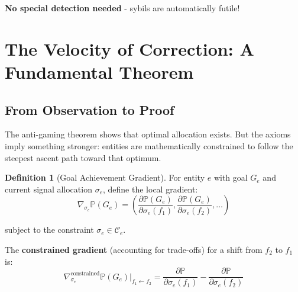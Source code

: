 \documentclass[11pt,a4paper]{article}
\theoremstyle{definition}
\newtheorem{definition}[theorem]{Definition}
\theoremstyle{remark}
\newcommand{\C}{\mathcal{C}}
\begin{document}
\textbf{No special detection needed} - sybils are automatically futile!

\section{The Velocity of Correction: A Fundamental Theorem}

\subsection{From Observation to Proof}

The anti-gaming theorem shows that optimal allocation exists. But the axioms imply something stronger: entities are mathematically constrained to follow the steepest ascent path toward that optimum.

\begin{definition}[Goal Achievement Gradient]
For entity $e$ with goal $G_e$ and current signal allocation $\sigma_e$, define the local gradient:
\[ \nabla_{\sigma_e} \mathbb{P}(G_e) = \left( \frac{\partial \mathbb{P}(G_e)}{\partial \sigma_e(f_1)}, \frac{\partial \mathbb{P}(G_e)}{\partial \sigma_e(f_2)}, \ldots \right) \]

subject to the constraint $\sigma_e \in \C_e$.

The \textbf{constrained gradient} (accounting for trade-offs) for a shift from $f_2$ to $f_1$ is:
\[ \nabla_{\sigma_e}^{\text{constrained}} \mathbb{P}(G_e) \bigg|_{f_1 \leftarrow f_2} = \frac{\partial \mathbb{P}}{\partial \sigma_e(f_1)} - \frac{\partial \mathbb{P}}{\partial \sigma_e(f_2)} \]
\end{definition}
\end{document}
